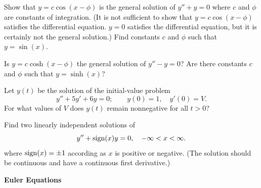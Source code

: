 {%
\begin{Exercise}
  \label{exercise y=c cos x-phi}
  Show that $y = c \cos(x - \phi)$ is the general solution of 
  $y'' + y = 0$ where $c$ and $\phi$ are constants of integration.
  (It is not sufficient to show that $y = c \cos(x-\phi)$ satisfies the
  differential equation.  $y = 0$ satisfies the differential equation,
  but it is certainly not the general solution.)  Find constants
  $c$ and $\phi$ such that $y = \sin(x)$.

  Is $y = c \cosh(x - \phi)$ the general solution of $y'' - y = 0$?
  Are there constants $c$ and $\phi$ such that $y = \sinh(x)$?

\end{Exercise}








\begin{Exercise}
  \label{exercise y+5y+6y}
  Let $y(t)$ be the solution of the initial-value problem
  \[
  y'' + 5 y' + 6 y = 0; \qquad
  y(0) = 1, \quad y'(0) = V.
  \]
  For what values of $V$ does $y(t)$ remain nonnegative for all $t > 0$?

\end{Exercise}








\begin{Exercise}
  \label{exercise y+sign y}
  Find two linearly independent solutions of
  \[
  y'' + \mathop{\mathrm{sign}}\nolimits(x) y = 0, \quad -\infty < x < \infty.
  \]
  where $\mathop{\mathrm{sign}}\nolimits(x) = \pm 1$ according as $x$ is positive or negative.  (The
  solution should be continuous and have a continuous first derivative.)

\end{Exercise}








\begin{large}
  \noindent
  \textbf{Euler Equations}
\end{large}




}
